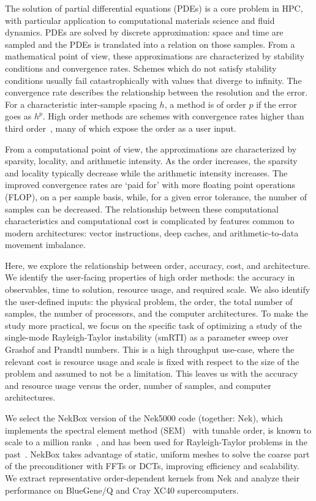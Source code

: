The solution of partial differential equations (PDEs) is a core problem in HPC, with particular application to computational materials science and fluid dynamics.
PDEs are solved by discrete approximation: space and time are sampled and the PDEs is translated into a relation on those samples.
From a mathematical point of view, these approximations are characterized by stability conditions and convergence rates.
Schemes which do not satisfy stability conditions usually fail catastrophically with values that diverge to infinity.
The convergence rate describes the relationship between the resolution and the error.
For a characteristic inter-sample spacing $h$, a method is of order $p$ if the error goes as $h^p$.
High order methods are schemes with convergence rates higher than third order~\cite{wang2013high}, many of which expose the order as a user input.

From a computational point of view, the approximations are characterized by sparsity, locality, and arithmetic intensity.
As the order increases, the sparsity and locality typically decrease while the arithmetic intensity increases.
The improved convergence rates are `paid for' with more floating point operations (FLOP), on a per sample basis, while, for a given error tolerance, the number of samples can be decreased.
The relationship between these computational characteristics and computational cost is complicated by features common to modern architectures: vector instructions, deep caches, and arithmetic-to-data movement imbalance.

Here, we explore the relationship between order, accuracy, cost, and architecture.
We identify the user-facing properties of high order methods: the accuracy in observables, time to solution, resource usage, and required scale.
We also identify the user-defined inputs: the physical problem, the order, the total number of samples, the number of processors, and the computer architectures.
To make the study more practical, we focus on the specific task of optimizing a study of the single-mode Rayleigh-Taylor instability (smRTI) as a parameter sweep over Grashof and Prandtl numbers.
This is a high throughput use-case, where the relevant cost is resource usage and scale is fixed with respect to the size of the problem and assumed to not be a limitation.
This leaves us with the accuracy and resource usage versus the order, number of samples, and computer architectures.

We select the NekBox version of the Nek5000 code (together: Nek), which
implements the spectral element method (SEM)~\cite{patera1984spectral} with tunable order, is known to scale to a million ranks~\cite{nekscaling}, and has been used for Rayleigh-Taylor problems in the past~\cite{hutchinson2015direct}.
NekBox takes advantage of static, uniform meshes to solve the coarse part of the preconditioner with FFTs or DCTs, improving efficiency and scalability.
We extract representative order-dependent kernels from Nek and analyze their
performance on BlueGene/Q and Cray XC40 supercomputers.

